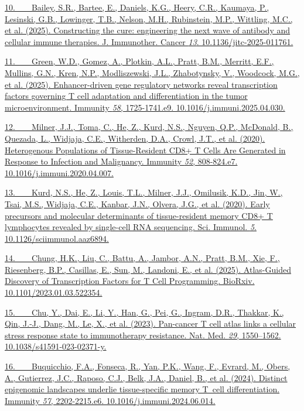 \href{https://sciwheel.com/work/bibliography/18201304}{10.~  Bailey,
S.R., Bartee, E., Daniels, K.G., Heery, C.R., Kaumaya, P., Lesinski,
G.B., Lowinger, T.B., Nelson, M.H., Rubinstein, M.P., Wittling, M.C., et
al. (2025). Constructing the cure: engineering the next wave of antibody
and cellular immune therapies. J. Immunother. Cancer \emph{13}.
10.1136/jitc-2025-011761.}

\href{https://sciwheel.com/work/bibliography/17904669}{11.~  Green,
W.D., Gomez, A., Plotkin, A.L., Pratt, B.M., Merritt, E.F., Mullins,
G.N., Kren, N.P., Modliszewski, J.L., Zhabotynsky, V., Woodcock, M.G.,
et al. (2025). Enhancer-driven gene regulatory networks reveal
transcription factors governing T cell adaptation and differentiation in
the tumor microenvironment. Immunity \emph{58}, 1725-1741.e9.
10.1016/j.immuni.2025.04.030.}

\href{https://sciwheel.com/work/bibliography/8940021}{12.~  Milner,
J.J., Toma, C., He, Z., Kurd, N.S., Nguyen, Q.P., McDonald, B., Quezada,
L., Widjaja, C.E., Witherden, D.A., Crowl, J.T., et al. (2020).
Heterogenous Populations of Tissue-Resident CD8+ T Cells Are Generated
in Response to Infection and Malignancy. Immunity \emph{52}, 808-824.e7.
10.1016/j.immuni.2020.04.007.}

\href{https://sciwheel.com/work/bibliography/8917053}{13.~  Kurd, N.S.,
He, Z., Louis, T.L., Milner, J.J., Omilusik, K.D., Jin, W., Tsai, M.S.,
Widjaja, C.E., Kanbar, J.N., Olvera, J.G., et al. (2020). Early
precursors and molecular determinants of tissue-resident memory CD8+ T
lymphocytes revealed by single-cell RNA sequencing. Sci. Immunol.
\emph{5}. 10.1126/sciimmunol.aaz6894.}

\href{https://sciwheel.com/work/bibliography/15807051}{14.~  Chung,
H.K., Liu, C., Battu, A., Jambor, A.N., Pratt, B.M., Xie, F.,
Riesenberg, B.P., Casillas, E., Sun, M., Landoni, E., et al. (2025).
Atlas-Guided Discovery of Transcription Factors for T Cell Programming.
BioRxiv. 10.1101/2023.01.03.522354.}

\href{https://sciwheel.com/work/bibliography/14885142}{15.~  Chu, Y.,
Dai, E., Li, Y., Han, G., Pei, G., Ingram, D.R., Thakkar, K., Qin,
J.-J., Dang, M., Le, X., et al. (2023). Pan-cancer T cell atlas links a
cellular stress response state to immunotherapy resistance. Nat. Med.
\emph{29}, 1550--1562. 10.1038/s41591-023-02371-y.}

\href{https://sciwheel.com/work/bibliography/16689366}{16.~  Buquicchio,
F.A., Fonseca, R., Yan, P.K., Wang, F., Evrard, M., Obers, A.,
Gutierrez, J.C., Raposo, C.J., Belk, J.A., Daniel, B., et al. (2024).
Distinct epigenomic landscapes underlie tissue-specific memory T~cell
differentiation. Immunity \emph{57}, 2202-2215.e6.
10.1016/j.immuni.2024.06.014.}

